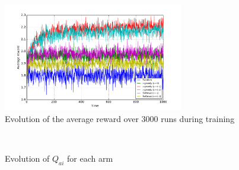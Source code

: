 \documentclass[a4paper]{article}
\begin{document}
\begin{figure}[H]
	\centering
	\includegraphics[width=0.7\textwidth]{./fig/ex1-2.pdf}
	\caption{Evolution of the average reward over 3000 runs during training}
	\label{ex12perf}
\end{figure}
\begin{figure}[H]
	\centering
	\\
	\caption{Evolution of $Q_{ai}$ for each arm}
	\label{ex12q}
\end{figure}
\end{document}
